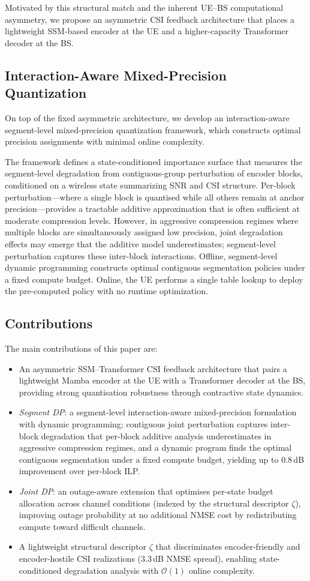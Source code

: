\documentclass[conference]{IEEEtran}
\begin{document}
Motivated by this structural match and the inherent UE--BS computational asymmetry, we propose an asymmetric CSI feedback architecture that places a lightweight SSM-based encoder at the UE and a higher-capacity Transformer decoder at the BS.

\subsection{Interaction-Aware Mixed-Precision Quantization}
On top of the fixed asymmetric architecture, we develop an interaction-aware segment-level mixed-precision quantization framework, which constructs optimal precision assignments with minimal online complexity.

The framework defines a state-conditioned importance surface that measures the segment-level degradation from contiguous-group perturbation of encoder blocks, conditioned on a wireless state summarizing SNR and CSI structure. Per-block perturbation---where a single block is quantised while all others remain at anchor precision---provides a tractable additive approximation that is often sufficient at moderate compression levels. However, in aggressive compression regimes where multiple blocks are simultaneously assigned low precision, joint degradation effects may emerge that the additive model underestimates; segment-level perturbation captures these inter-block interactions. Offline, segment-level dynamic programming constructs optimal contiguous segmentation policies under a fixed compute budget. Online, the UE performs a single table lookup to deploy the pre-computed policy with no runtime optimization.

\subsection{Contributions}
The main contributions of this paper are:
\begin{itemize}
\item An asymmetric SSM--Transformer CSI feedback architecture that pairs a lightweight Mamba encoder at the UE with a Transformer decoder at the BS, providing strong quantisation robustness through contractive state dynamics.
\item \emph{Segment DP}: a segment-level interaction-aware mixed-precision formulation with dynamic programming; contiguous joint perturbation captures inter-block degradation that per-block additive analysis underestimates in aggressive compression regimes, and a dynamic program finds the optimal contiguous segmentation under a fixed compute budget, yielding up to 0.8\,dB improvement over per-block ILP.
\item \emph{Joint DP}: an outage-aware extension that optimises per-state budget allocation across channel conditions (indexed by the structural descriptor $\zeta$), improving outage probability at no additional NMSE cost by redistributing compute toward difficult channels.
\item A lightweight structural descriptor $\zeta$ that discriminates encoder-friendly and encoder-hostile CSI realizations (3.3\,dB NMSE spread), enabling state-conditioned degradation analysis with $\mathcal{O}(1)$ online complexity.
\end{itemize}
\end{document}
